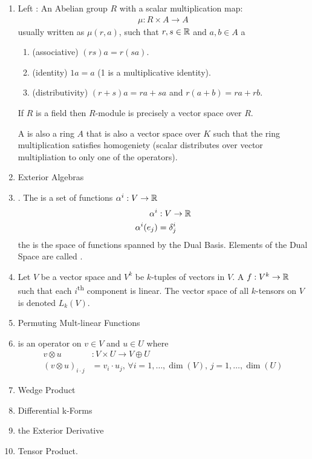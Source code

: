 \documentclass[10pt,a4paper]{report}
\begin{document}
\begin{enumerate}
\begin{itemize}
	\end{itemize}
	\item Left : An Abelian group $R$ with a scalar multiplication map:
	\begin{align*}
		\mu : R \times A \to A
	\end{align*}usually written as $\mu(r,a)$, such that $r,s \in \mathbb{R}$ and $a,b \in A$	 a
	\begin{enumerate}[label=(\roman*)]
		\item (associative) $(rs)a = r(sa)$.
		\item (identity) $1a = a$ (1 is a multiplicative identity).
		\item (distributivity) $(r+s)a = ra+sa$ and $r(a+b) = ra+rb$.	
	\end{enumerate}	 If $R$ is a field then $R$-module is precisely a vector space over $R$.
	
	A  is also a ring $A$ that is also a vector space over $K$ such that the ring multiplication satisfies homogeniety (scalar distributes over vector multipliation to only one of the operators).
	\item Exterior Algebras
	\item {}.  The  is a set of functions $\alpha^i: V \to \mathbb{R}$ 
	\begin{align*}
		\alpha^i &: V \to \mathbb{R} \\
			\alpha^i(e_j) &= \delta_j^i
	\end{align*}the  is the space of functions spanned by the Dual Basis. Elements of the Dual Space are called .  
	\item {} Let $V$ be a vector space and $V^k$ be $k$-tuples of vectors in $V$. A  $f: V^k \to \mathbb{R}$ such that each $i$\textsuperscript{th} component is linear.  The vector space of all $k$-tensors on $V$ is denoted $L_k(V)$.
	\item Permuting Mult-linear Functions
	\item {} is an operator on $v \in V$ and $u \in U$ where 
	\begin{align*}
		v \otimes u &: V \times U \to V \oplus U \\
		(v \otimes u)_{i\cdot j} &= v_i \cdot u_j,\, \forall i=1,\dots,\dim(V),\, j=1,\dots,\dim(U)
	\end{align*}
	\item Wedge Product
	\item Differential k-Forms
	\item the Exterior Derivative
	\item Tensor Product.
	

\end{enumerate}
\end{document}
